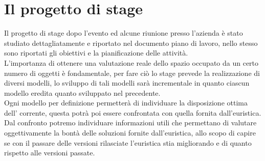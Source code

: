 \section{Il progetto di stage}
Il progetto di stage dopo l'evento  ed alcune riunione presso l'azienda è stato studiato dettagliatamente e riportato nel documento piano di lavoro, nello stesso sono riportati gli obiettivi e la pianificazione delle attività.\\
L'importanza di ottenere una valutazione reale dello spazio occupato da un certo numero di oggetti è fondamentale, per fare ciò lo stage prevede la realizzazione di diversi modelli, lo sviluppo di tali modelli sarà incrementale in quanto ciascun modello eredita quanto sviluppato nel precedente.\\
Ogni modello per definizione permetterà di individuare la disposizione ottima dell' corrente, questa potrà poi essere confrontata con quella fornita dall'euristica. Dal confronto potremo individuare informazioni utili che permettano di valutare oggettivamente la bontà delle soluzioni fornite dall'euristica, allo scopo di capire se con il passare delle versioni rilasciate l'euristica stia migliorando e di quanto rispetto alle versioni passate.

